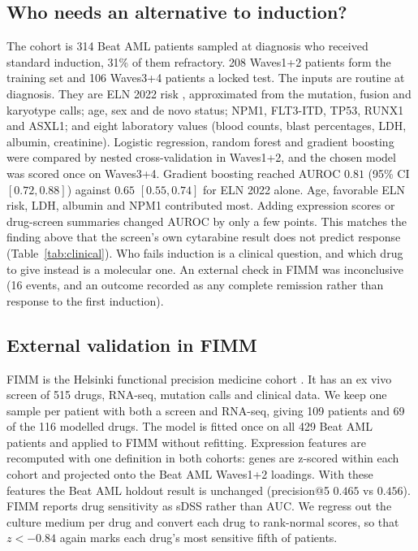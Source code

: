 \documentclass[11pt,logo,nonumbering]{preprint}
\newcommand{\z}{z}
\begin{document}
\subsection{Who needs an alternative to induction?}
The cohort is 314 Beat AML patients sampled at diagnosis who received standard induction, 31\% of them refractory. 208 Waves1+2 patients form the training set and 106 Waves3+4 patients a locked test. The inputs are routine at diagnosis. They are ELN 2022 risk \citep{dohner2022eln}, approximated from the mutation, fusion and karyotype calls; age, sex and de novo status; NPM1, FLT3-ITD, TP53, RUNX1 and ASXL1; and eight laboratory values (blood counts, blast percentages, LDH, albumin, creatinine). Logistic regression, random forest and gradient boosting were compared by nested cross-validation in Waves1+2, and the chosen model was scored once on Waves3+4. Gradient boosting reached AUROC $0.81$ (95\% CI $[0.72, 0.88]$) against $0.65$ $[0.55, 0.74]$ for ELN 2022 alone. Age, favorable ELN risk, LDH, albumin and NPM1 contributed most. Adding expression scores or drug-screen summaries changed AUROC by only a few points. This matches the finding above that the screen's own cytarabine result does not predict response (Table~\ref{tab:clinical}). Who fails induction is a clinical question, and which drug to give instead is a molecular one. An external check in FIMM was inconclusive (16 events, and an outcome recorded as any complete remission rather than response to the first induction).

\subsection{External validation in FIMM}
FIMM is the Helsinki functional precision medicine cohort \citep{malani2022}. It has an ex vivo screen of 515 drugs, RNA-seq, mutation calls and clinical data. We keep one sample per patient with both a screen and RNA-seq, giving 109 patients and 69 of the 116 modelled drugs. The model is fitted once on all 429 Beat AML patients and applied to FIMM without refitting. Expression features are recomputed with one definition in both cohorts: genes are z-scored within each cohort and projected onto the Beat AML Waves1+2 loadings. With these features the Beat AML holdout result is unchanged (precision@5 $0.465$ vs $0.456$). FIMM reports drug sensitivity as sDSS rather than AUC. We regress out the culture medium per drug and convert each drug to rank-normal scores, so that $\z<-0.84$ again marks each drug's most sensitive fifth of patients.
\end{document}
